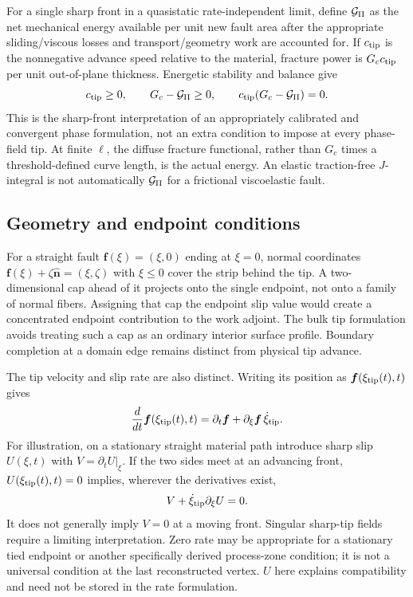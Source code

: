 \documentclass[10pt,a4paper]{article}
\begin{document}
For a single sharp front in a quasistatic rate-independent limit, define
$\mathcal G_{\rm II}$ as the net mechanical energy available per unit new
fault area after the appropriate sliding/viscous losses and transport/geometry
work are accounted for. If $c_{\rm tip}$ is the nonnegative advance speed
relative to the material, fracture power is $G_c c_{\rm tip}$ per unit
out-of-plane thickness. Energetic stability and balance give
\begin{equation}
 c_{\rm tip}\geq0,\qquad
 G_c-\mathcal G_{\rm II}\geq0,\qquad
 c_{\rm tip}(G_c-\mathcal G_{\rm II})=0.
 \label{eq:tip_griffith}
\end{equation}
This is the sharp-front interpretation of an appropriately calibrated and
convergent phase formulation, not an extra condition to impose at every
phase-field tip. At finite $\ell$, the diffuse fracture functional, rather
than $G_c$ times a threshold-defined curve length, is the actual energy.
An elastic traction-free $J$-integral is not automatically
$\mathcal G_{\rm II}$ for a frictional viscoelastic fault.

\subsection{Geometry and endpoint conditions}

For a straight fault $\bm f(\xi)=(\xi,0)$ ending at $\xi=0$, normal
coordinates $\bm f(\xi)+\zeta\hat{\bm n}=(\xi,\zeta)$ with $\xi\leq0$
cover the strip behind the tip. A two-dimensional cap ahead of it projects
onto the single endpoint, not onto a family of normal fibers. Assigning that
cap the endpoint slip value would create a concentrated endpoint contribution
to the work adjoint. The bulk tip formulation avoids treating such a cap as
an ordinary interior surface profile. Boundary completion at a domain edge
remains distinct from physical tip advance.

The tip velocity and slip rate are also distinct. Writing its position as
$\bm f(\xi_{\rm tip}(t),t)$ gives
\begin{equation}
 \frac{d}{dt}\bm f(\xi_{\rm tip}(t),t)
 =\partial_t\bm f+\partial_\xi\bm f\,\dot\xi_{\rm tip}.
 \label{eq:tip_motion}
\end{equation}
For illustration, on a stationary straight material path introduce sharp slip
$U(\xi,t)$ with $V=\partial_tU|_\xi$. If the two sides meet at an advancing
front, $U(\xi_{\rm tip}(t),t)=0$ implies, wherever the derivatives exist,
\begin{equation}
 V+\dot\xi_{\rm tip}\partial_\xi U=0.
 \label{eq:tip_compatibility}
\end{equation}
It does not generally imply $V=0$ at a moving front. Singular sharp-tip
fields require a limiting interpretation. Zero rate may be appropriate for
a stationary tied endpoint or another specifically derived process-zone
condition; it is not a universal condition at the last reconstructed vertex.
$U$ here explains compatibility and need not be stored in the rate formulation.
\end{document}
